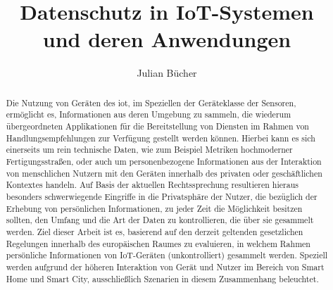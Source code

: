 \documentclass[runningheads]{llncs}
\begin{document}

\title{Datenschutz in IoT-Systemen \\und deren Anwendungen}
%
%
\author{Julian Bücher}
%
%
%
\maketitle              %


\begin{abstract}
Die Nutzung von Geräten des \ac{iot}, im Speziellen der Geräteklasse der Sensoren, ermöglicht es, Informationen aus deren Umgebung zu sammeln, die wiederum übergeordneten Applikationen für die Bereitstellung von Diensten im Rahmen von Handlungsempfehlungen zur Verfügung gestellt werden können.
Hierbei kann es sich einerseits um rein technische Daten, wie zum Beispiel Metriken hochmoderner Fertigungsstraßen, oder auch um personenbezogene Informationen aus der Interaktion von menschlichen Nutzern mit den Geräten innerhalb des privaten oder geschäftlichen Kontextes handeln. 
Auf Basis der aktuellen Rechtssprechung resultieren hieraus besonders schwerwiegende Eingriffe in die Privatsphäre der Nutzer, die bezüglich der Erhebung von persönlichen Informationen, zu jeder Zeit die Möglichkeit besitzen sollten, den Umfang und die Art der Daten zu kontrollieren, die über sie gesammelt werden.
Ziel dieser Arbeit ist es, basierend auf den derzeit geltenden gesetzlichen Regelungen innerhalb des europäischen Raumes zu evaluieren, in welchem Rahmen persönliche Informationen von IoT-Geräten (unkontrolliert) gesammelt werden.
Speziell werden aufgrund der höheren Interaktion von Gerät und Nutzer im Bereich von Smart Home und Smart City, ausschließlich Szenarien in diesem Zusammenhang beleuchtet.

\end{abstract}
\end{document}
